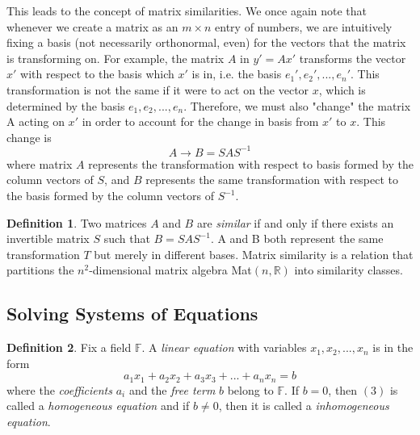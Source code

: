 \documentclass{article}
\theoremstyle{remark}
\theoremstyle{definition}
\newtheorem{definition}{Definition}[section]
\begin{document}
    This leads to the concept of matrix similarities. We once again note that whenever we create a matrix as an $m \times n$ entry of numbers, we are intuitively fixing a basis (not necessarily orthonormal, even) for the vectors that the matrix is transforming on. For example, the matrix $A$ in $y' = Ax'$ transforms the vector $x'$ with respect to the basis which $x'$ is in, i.e. the basis ${e_1', e_2', ..., e_n'}$. This transformation is not the same if it were to act on the vector $x$, which is determined by the basis ${e_1, e_2, ..., e_n}$. Therefore, we must also "change" the matrix A acting on $x'$ in order to account for the change in basis from $x'$ to $x$. This change is 
    \[A \rightarrow B = S A S^{-1}\]
    where matrix $A$ represents the transformation with respect to basis formed by the column vectors of $S$, and $B$ represents the same transformation with respect to the basis formed by the column vectors of $S^{-1}$. 

    \begin{definition}
    Two matrices $A$ and $B$ are \textit{similar} if and only if there exists an invertible matrix $S$ such that $B = S A S^{-1}$. A and B both represent the same transformation $T$ but merely in different bases. Matrix similarity is a relation that partitions the $n^2$-dimensional matrix algebra Mat$(n, \mathbb{R})$ into similarity classes. 
    \end{definition}

  \subsection{Solving Systems of Equations}

    \begin{definition}
    Fix a field $\mathbb{F}$. A \textit{linear equation} with variables $x_1, x_2, ..., x_n$ is in the form 
    \begin{equation}
        a_1 x_1 + a_2 x_2 + a_3 x_3 + ... + a_n x_n = b
    \end{equation}
    where the \textit{coefficients} $a_i$ and the \textit{free term} $b$ belong to $\mathbb{F}$. If $b = 0$, then $(3)$ is called a \textit{homogeneous equation} and if $b \neq 0$, then it is called a \textit{inhomogeneous equation}. 
    \end{definition}
\end{document}
